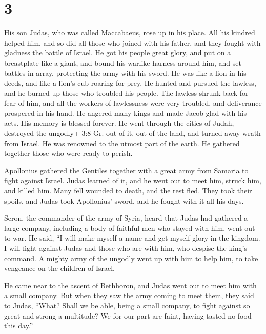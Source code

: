 \hypertarget{section-2}{%
\section{3}\label{section-2}}

 His son Judas, who was called Maccabaeus, rose up in his
place.  All his kindred helped him, and so did all those who
joined with his father, and they fought with gladness the battle of
Israel.  He got his people great glory, and put on a
breastplate like a giant, and bound his warlike harness around him, and
set battles in array, protecting the army with his sword. 
He was like a lion in his deeds, and like a lion's cub roaring for prey.
 He hunted and pursued the lawless, and he burned up those
who troubled his people.  The lawless shrunk back for fear
of him, and all the workers of lawlessness were very troubled, and
deliverance prospered in his hand.  He angered many kings
and made Jacob glad with his acts. His memory is blessed forever.
 He went through the cities of Judah, destroyed the ungodly+
3:8 Gr. out of it. out of the land, and turned away wrath from Israel.
 He was renowned to the utmost part of the earth. He
gathered together those who were ready to perish.

 Apollonius gathered the Gentiles together with a great
army from Samaria to fight against Israel.  Judas learned
of it, and he went out to meet him, struck him, and killed him. Many
fell wounded to death, and the rest fled.  They took their
spoils, and Judas took Apollonius' sword, and he fought with it all his
days.

 Seron, the commander of the army of Syria, heard that
Judas had gathered a large company, including a body of faithful men who
stayed with him, went out to war.  He said, ``I will make
myself a name and get myself glory in the kingdom. I will fight against
Judas and those who are with him, who despise the king's command.
 A mighty army of the ungodly went up with him to help him,
to take vengeance on the children of Israel.

 He came near to the ascent of Bethhoron, and Judas went
out to meet him with a small company.  But when they saw
the army coming to meet them, they said to Judas, ``What? Shall we be
able, being a small company, to fight against so great and strong a
multitude? We for our part are faint, having tasted no food this day.''

